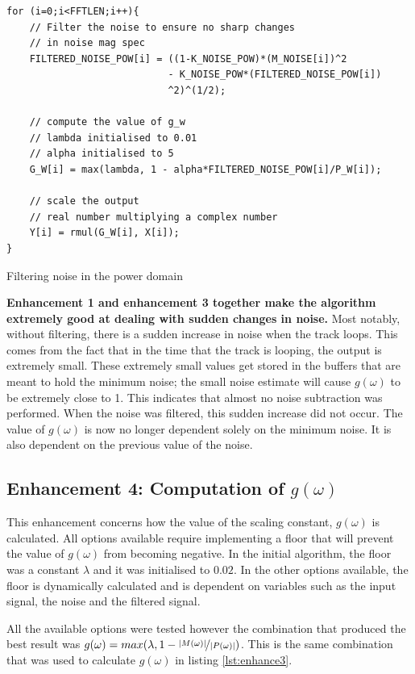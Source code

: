 \documentclass[a4paper,pra,twocolumn,10pt,aps,longbibliography,nobalancelastpage]{revtex4-1}
\begin{document}
\begin{listing}[H]
\begin{verbatim}
for (i=0;i<FFTLEN;i++){
    // Filter the noise to ensure no sharp changes 
    // in noise mag spec
    FILTERED_NOISE_POW[i] = ((1-K_NOISE_POW)*(M_NOISE[i])^2 
                            - K_NOISE_POW*(FILTERED_NOISE_POW[i])
                            ^2)^(1/2);
    
    // compute the value of g_w
    // lambda initialised to 0.01
    // alpha initialised to 5
    G_W[i] = max(lambda, 1 - alpha*FILTERED_NOISE_POW[i]/P_W[i]);
    
    // scale the output
    // real number multiplying a complex number
    Y[i] = rmul(G_W[i], X[i]);
}
\end{verbatim}
\caption{Filtering noise in the power domain} 
\label{lst:enhance3_power}
\end{listing}


\textbf{Enhancement 1 and enhancement 3 together make the algorithm extremely good at dealing with sudden changes in noise.} Most notably, without filtering, there is a sudden increase in noise when the track loops. This comes from the fact that in the time that the track is looping, the output is extremely small. These extremely small values get stored in the buffers that are meant to hold the minimum noise; the small noise estimate will cause $g(\omega)$ to be extremely close to 1. This indicates that almost no noise subtraction was performed. When the noise was filtered, this sudden increase did not occur. The value of $g(\omega)$ is now no longer dependent solely on the minimum noise. It is also dependent on the previous value of the noise.

\subsection{Enhancement 4: Computation of $g(\omega)$}
This enhancement concerns how the value of the scaling constant, $g(\omega)$ is calculated. All options available require implementing a floor that will prevent the value of $g(\omega)$ from becoming negative. In the initial algorithm, the floor was a constant $\lambda$ and it was initialised to $0.02$. In the other options available, the floor is dynamically calculated and is dependent on variables such as the input signal, the noise and the filtered signal.

All the available options were tested however the combination that produced the best result was $g(\omega) = max(\lambda, 1-\nicefrac{|M(\omega)|}{|P(\omega)|})$. This is the same combination that was used to calculate $g(\omega)$ in listing \ref{lst:enhance3}.
\end{document}
